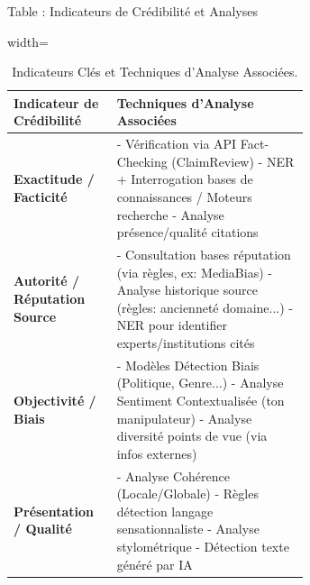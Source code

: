 \documentclass[9pt]{beamer}
\begin{document}
\begin{frame}{Table : Indicateurs de Crédibilité et Analyses}
  \begin{table}[htbp]
    \centering
    \caption{Indicateurs Clés et Techniques d'Analyse Associées.}
    \label{tab:beamer_credibility_indicators}
    \tiny %
    \begin{adjustbox}{width=\textwidth} %
    \begin{tabular}{@{}lp{0.65\linewidth}@{}} %
      \toprule
      Indicateur de Crédibilité & Techniques d'Analyse Associées \\
      \midrule
      \textbf{Exactitude / Facticité} \citet{Pescuma2025} & - Vérification via API Fact-Checking (ClaimReview) \citet{ClaimReviewSchema, Google2026Fact} \newline - NER + Interrogation bases de connaissances / Moteurs recherche \citet{Oshikawa2019A} \newline - Analyse présence/qualité citations \citet{Kedzie2018} \\ %
      \addlinespace
      \textbf{Autorité / Réputation Source} \citet{Pescuma2025} & - Consultation bases réputation (via règles, ex: MediaBias) \citet{W3CCredibility2018} \newline - Analyse historique source (règles: ancienneté domaine...) \newline - NER pour identifier experts/institutions cités \citet{Oshikawa2019A} \\ %
      \addlinespace
      \textbf{Objectivité / Biais} \citet{Pescuma2025} & - Modèles Détection Biais (Politique, Genre...) \citet{Shah2024Decoding, Menzner2018Biasscanner, Baly2020We} \newline - Analyse Sentiment Contextualisée (ton manipulateur) \citet{Ahmed2025Aidriven} \newline - Analyse diversité points de vue (via infos externes) \\ %
      \addlinespace
      \textbf{Présentation / Qualité} \citet{Pescuma2025} & - Analyse Cohérence (Locale/Globale) \citet{Willems2020Modeling, Barzilay2008} \newline - Règles détection langage sensationnaliste \citet{Kedzie2018} \newline - Analyse stylométrique \citet{Ahmed2025Aidriven} \newline - Détection texte généré par IA \citet{Willems2020Modeling, Kedzie2018} \\ %

\end{tabular}
\end{adjustbox}
\end{table}
\end{frame}
\end{document}
